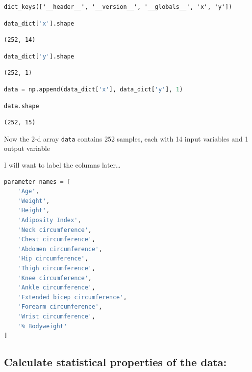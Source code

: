 \begin{lstlisting}
dict_keys(['__header__', '__version__', '__globals__', 'x', 'y'])
\end{lstlisting}

\begin{lstlisting}[language=Python]
data_dict['x'].shape
\end{lstlisting}

\begin{lstlisting}
(252, 14)
\end{lstlisting}

\begin{lstlisting}[language=Python]
data_dict['y'].shape
\end{lstlisting}

\begin{lstlisting}
(252, 1)
\end{lstlisting}

\begin{lstlisting}[language=Python]
data = np.append(data_dict['x'], data_dict['y'], 1)
\end{lstlisting}

\begin{lstlisting}[language=Python]
data.shape
\end{lstlisting}

\begin{lstlisting}
(252, 15)
\end{lstlisting}

Now the 2-d array \passthrough{\lstinline!data!} contains 252 samples,
each with 14 input variables and 1 output variable

I will want to label the columns later\ldots{}

\begin{lstlisting}[language=Python]
parameter_names = [
    'Age',
    'Weight',
    'Height',
    'Adiposity Index',
    'Neck circumference',
    'Chest circumference',
    'Abdomen circumference',
    'Hip circumference',
    'Thigh circumference',
    'Knee circumference',
    'Ankle circumference',
    'Extended bicep circumference',
    'Forearm circumference',
    'Wrist circumference',
    '% Bodyweight'
]
\end{lstlisting}

\hypertarget{calculate-statistical-properties-of-the-data}{%
\subsection{Calculate statistical properties of the
data:}\label{calculate-statistical-properties-of-the-data}}

